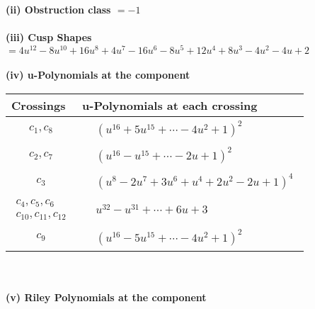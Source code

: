 \documentclass[1p]{elsarticle_modified}
\theoremstyle{definition}
\begin{document}
\flushleft \textbf{(ii) Obstruction class $= -1$}\\~\\
\flushleft \textbf{(iii) Cusp Shapes $= 4 u^{12}-8 u^{10}+16 u^8+4 u^7-16 u^6-8 u^5+12 u^4+8 u^3-4 u^2-4 u+2$}\\~\\
\newpage\renewcommand{\arraystretch}{1}
\flushleft \textbf{(iv) u-Polynomials at the component}\newline \\
\begin{tabular}{m{50pt}|m{274pt}}
Crossings & \hspace{64pt}u-Polynomials at each crossing \\
\hline $$\begin{aligned}c_{1},c_{8}\end{aligned}$$&$\begin{aligned}
&(u^{16}+5 u^{15}+\cdots-4 u^2+1)^{2}
\end{aligned}$\\
\hline $$\begin{aligned}c_{2},c_{7}\end{aligned}$$&$\begin{aligned}
&(u^{16}- u^{15}+\cdots-2 u+1)^{2}
\end{aligned}$\\
\hline $$\begin{aligned}c_{3}\end{aligned}$$&$\begin{aligned}
&(u^8-2 u^7+3 u^6+u^4+2 u^2-2 u+1)^4
\end{aligned}$\\
\hline $$\begin{aligned}c_{4},c_{5},c_{6}\\c_{10},c_{11},c_{12}\end{aligned}$$&$\begin{aligned}
&u^{32}- u^{31}+\cdots+6 u+3
\end{aligned}$\\
\hline $$\begin{aligned}c_{9}\end{aligned}$$&$\begin{aligned}
&(u^{16}-5 u^{15}+\cdots-4 u^2+1)^{2}
\end{aligned}$\\
\hline
\end{tabular}\\~\\
\newpage\renewcommand{\arraystretch}{1}
\flushleft \textbf{(v) Riley Polynomials at the component}\newline \\
\end{document}
